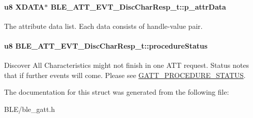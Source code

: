 \paragraph[{\texorpdfstring{p\+\_\+attr\+Data}{p_attrData}}]{\setlength{\rightskip}{0pt plus 5cm}u8 X\+D\+A\+TA$\ast$ B\+L\+E\+\_\+\+A\+T\+T\+\_\+\+E\+V\+T\+\_\+\+Disc\+Char\+Resp\+\_\+t\+::p\+\_\+attr\+Data}\hypertarget{struct_b_l_e___a_t_t___e_v_t___disc_char_resp__t_ac6460efa796aec00f562934e74b839dc}{}\label{struct_b_l_e___a_t_t___e_v_t___disc_char_resp__t_ac6460efa796aec00f562934e74b839dc}
The attribute data list. Each data consists of handle-\/value pair. 
\paragraph[{\texorpdfstring{procedure\+Status}{procedureStatus}}]{\setlength{\rightskip}{0pt plus 5cm}u8 B\+L\+E\+\_\+\+A\+T\+T\+\_\+\+E\+V\+T\+\_\+\+Disc\+Char\+Resp\+\_\+t\+::procedure\+Status}\hypertarget{struct_b_l_e___a_t_t___e_v_t___disc_char_resp__t_acc1027ec96ed2ad406e3607da998d910}{}\label{struct_b_l_e___a_t_t___e_v_t___disc_char_resp__t_acc1027ec96ed2ad406e3607da998d910}
Discover All Characteristics might not finish in one A\+TT request. Status notes that if further events will come. Please see \hyperlink{group___g_a_t_t___p_r_o_c_e_d_u_r_e___s_t_a_t_u_s}{G\+A\+T\+T\+\_\+\+P\+R\+O\+C\+E\+D\+U\+R\+E\+\_\+\+S\+T\+A\+T\+US}. 

The documentation for this struct was generated from the following file\+:\begin{DoxyCompactItemize}
\item 
B\+L\+E/ble\+\_\+gatt.\+h\end{DoxyCompactItemize}
